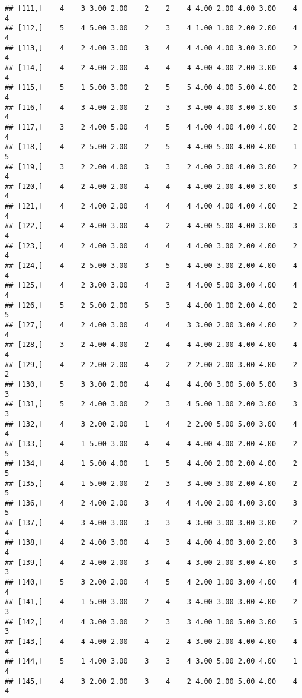 \documentclass[]{article}
\begin{document}
\begin{verbatim}
## [111,]    4    3 3.00 2.00    2    2    4 4.00 2.00 4.00 3.00    4    4
## [112,]    5    4 5.00 3.00    2    3    4 1.00 1.00 2.00 2.00    4    4
## [113,]    4    2 4.00 3.00    3    4    4 4.00 4.00 3.00 3.00    2    4
## [114,]    4    2 4.00 2.00    4    4    4 4.00 4.00 2.00 3.00    4    4
## [115,]    5    1 5.00 3.00    2    5    5 4.00 4.00 5.00 4.00    2    4
## [116,]    4    3 4.00 2.00    2    3    3 4.00 4.00 3.00 3.00    3    4
## [117,]    3    2 4.00 5.00    4    5    4 4.00 4.00 4.00 4.00    2    4
## [118,]    4    2 5.00 2.00    2    5    4 4.00 5.00 4.00 4.00    1    5
## [119,]    3    2 2.00 4.00    3    3    2 4.00 2.00 4.00 3.00    2    4
## [120,]    4    2 4.00 2.00    4    4    4 4.00 2.00 4.00 3.00    3    4
## [121,]    4    2 4.00 2.00    4    4    4 4.00 4.00 4.00 4.00    2    4
## [122,]    4    2 4.00 3.00    4    2    4 4.00 5.00 4.00 3.00    3    4
## [123,]    4    2 4.00 3.00    4    4    4 4.00 3.00 2.00 4.00    2    4
## [124,]    4    2 5.00 3.00    3    5    4 4.00 3.00 2.00 4.00    4    4
## [125,]    4    2 3.00 3.00    4    3    4 4.00 5.00 3.00 4.00    4    4
## [126,]    5    2 5.00 2.00    5    3    4 4.00 1.00 2.00 4.00    2    5
## [127,]    4    2 4.00 3.00    4    4    3 3.00 2.00 3.00 4.00    2    4
## [128,]    3    2 4.00 4.00    2    4    4 4.00 2.00 4.00 4.00    4    4
## [129,]    4    2 2.00 2.00    4    2    2 2.00 2.00 3.00 4.00    2    2
## [130,]    5    3 3.00 2.00    4    4    4 4.00 3.00 5.00 5.00    3    3
## [131,]    5    2 4.00 3.00    2    3    4 5.00 1.00 2.00 3.00    3    3
## [132,]    4    3 2.00 2.00    1    4    2 2.00 5.00 5.00 3.00    4    4
## [133,]    4    1 5.00 3.00    4    4    4 4.00 4.00 2.00 4.00    2    5
## [134,]    4    1 5.00 4.00    1    5    4 4.00 2.00 2.00 4.00    2    5
## [135,]    4    1 5.00 2.00    2    3    3 4.00 3.00 2.00 4.00    2    5
## [136,]    4    2 4.00 2.00    3    4    4 4.00 2.00 4.00 3.00    3    5
## [137,]    4    3 4.00 3.00    3    3    4 3.00 3.00 3.00 3.00    2    4
## [138,]    4    2 4.00 3.00    4    3    4 4.00 4.00 3.00 2.00    3    4
## [139,]    4    2 4.00 2.00    3    4    4 3.00 2.00 3.00 4.00    3    3
## [140,]    5    3 2.00 2.00    4    5    4 2.00 1.00 3.00 4.00    4    4
## [141,]    4    1 5.00 3.00    2    4    3 4.00 3.00 3.00 4.00    2    3
## [142,]    4    4 3.00 3.00    2    3    3 4.00 1.00 5.00 3.00    5    3
## [143,]    4    4 4.00 2.00    4    2    4 3.00 2.00 4.00 4.00    4    4
## [144,]    5    1 4.00 3.00    3    3    4 3.00 5.00 2.00 4.00    1    4
## [145,]    4    3 2.00 2.00    3    4    2 4.00 2.00 5.00 4.00    4    4

\end{verbatim}
\end{document}
